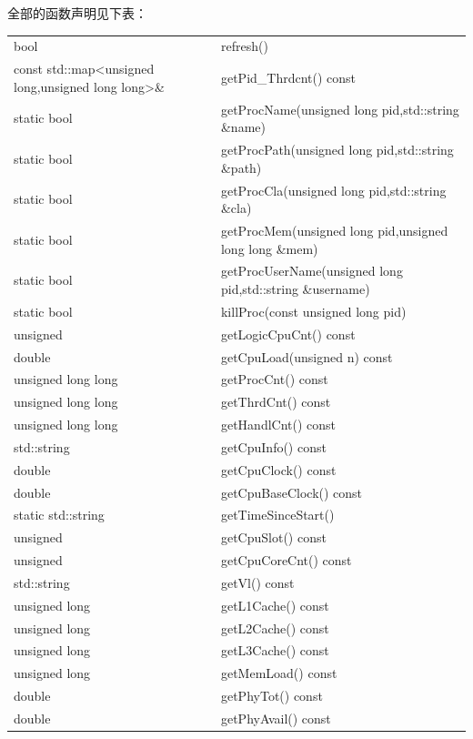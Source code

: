 \documentclass[UTF8,twoside,titlepage]{ctexart}
\begin{document}
全部的函数声明见下表：

{
    \ttfamily
    \centering
    \begin{longtable}{>{\raggedleft\arraybackslash}p{18em}p{24em}}
        \hline
        bool & refresh() \\
        const std::map<unsigned long,unsigned long long>\& & getPid\_Thrdcnt() const \\
        static bool & getProcName(unsigned long pid,std::string \&name) \\
        static bool & getProcPath(unsigned long pid,std::string \&path) \\
        static bool & getProcCla(unsigned long pid,std::string \&cla) \\
        static bool & getProcMem(unsigned long pid,unsigned long long \&mem) \\
        static bool & getProcUserName(unsigned long pid,std::string \&username) \\
        static bool & killProc(const unsigned long pid) \\
        unsigned & getLogicCpuCnt() const \\
        double & getCpuLoad(unsigned n) const \\
        unsigned long long & getProcCnt() const \\
        unsigned long long & getThrdCnt() const \\
        unsigned long long & getHandlCnt() const \\
        std::string & getCpuInfo() const \\
        double & getCpuClock() const \\
        double & getCpuBaseClock() const \\
        static std::string & getTimeSinceStart() \\
        unsigned & getCpuSlot() const \\
        unsigned & getCpuCoreCnt() const \\
        std::string & getVl() const \\
        unsigned long & getL1Cache() const \\
        unsigned long & getL2Cache() const \\
        unsigned long & getL3Cache() const \\
        unsigned long & getMemLoad() const \\
        double & getPhyTot() const \\
        double & getPhyAvail() const \\

\end{longtable}}
\end{document}
